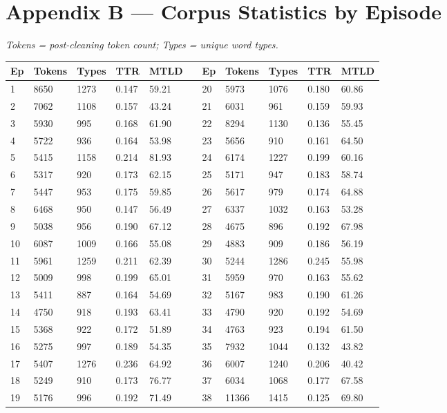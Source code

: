 \documentclass[11pt]{article}
\begin{document}
\FloatBarrier
\needspace{0.46\textheight}
\section*{Appendix B --- Corpus Statistics by Episode}

\emph{Tokens = post-cleaning token count; Types = unique word types.}

\begin{center}
\small\setlength{\tabcolsep}{4pt}
\begin{tabular}{lllllllllll}
\toprule
Ep & Tokens & Types & TTR & MTLD &  & Ep & Tokens & Types & TTR & MTLD \\
\midrule
1 & 8650 & 1273 & 0.147 & 59.21 &  & 20 & 5973 & 1076 & 0.180 & 60.86 \\
2 & 7062 & 1108 & 0.157 & 43.24 &  & 21 & 6031 & 961 & 0.159 & 59.93 \\
3 & 5930 & 995 & 0.168 & 61.90 &  & 22 & 8294 & 1130 & 0.136 & 55.45 \\
4 & 5722 & 936 & 0.164 & 53.98 &  & 23 & 5656 & 910 & 0.161 & 64.50 \\
5 & 5415 & 1158 & 0.214 & 81.93 &  & 24 & 6174 & 1227 & 0.199 & 60.16 \\
6 & 5317 & 920 & 0.173 & 62.15 &  & 25 & 5171 & 947 & 0.183 & 58.74 \\
7 & 5447 & 953 & 0.175 & 59.85 &  & 26 & 5617 & 979 & 0.174 & 64.88 \\
8 & 6468 & 950 & 0.147 & 56.49 &  & 27 & 6337 & 1032 & 0.163 & 53.28 \\
9 & 5038 & 956 & 0.190 & 67.12 &  & 28 & 4675 & 896 & 0.192 & 67.98 \\
10 & 6087 & 1009 & 0.166 & 55.08 &  & 29 & 4883 & 909 & 0.186 & 56.19 \\
11 & 5961 & 1259 & 0.211 & 62.39 &  & 30 & 5244 & 1286 & 0.245 & 55.98 \\
12 & 5009 & 998 & 0.199 & 65.01 &  & 31 & 5959 & 970 & 0.163 & 55.62 \\
13 & 5411 & 887 & 0.164 & 54.69 &  & 32 & 5167 & 983 & 0.190 & 61.26 \\
14 & 4750 & 918 & 0.193 & 63.41 &  & 33 & 4790 & 920 & 0.192 & 54.69 \\
15 & 5368 & 922 & 0.172 & 51.89 &  & 34 & 4763 & 923 & 0.194 & 61.50 \\
16 & 5275 & 997 & 0.189 & 54.35 &  & 35 & 7932 & 1044 & 0.132 & 43.82 \\
17 & 5407 & 1276 & 0.236 & 64.92 &  & 36 & 6007 & 1240 & 0.206 & 40.42 \\
18 & 5249 & 910 & 0.173 & 76.77 &  & 37 & 6034 & 1068 & 0.177 & 67.58 \\
19 & 5176 & 996 & 0.192 & 71.49 &  & 38 & 11366 & 1415 & 0.125 & 69.80 \\
\bottomrule
\end{tabular}
\end{center}
\end{document}
